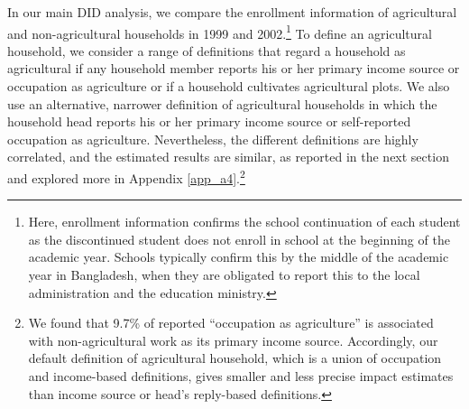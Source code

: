 \documentclass[12pt,letterpaper]{article}
\newcommand{\0}{\ensuremath{\mbox{\boldmath $0$}}}
\begin{document}
In our main DID analysis, we compare the enrollment information of agricultural and non-agricultural households in 1999 and 2002.\footnote{Here, enrollment information confirms the school continuation of each student as the discontinued student does not enroll in school at the beginning of the academic year. Schools typically confirm this by the middle of the academic year in Bangladesh, when they are obligated to report this to the local administration and the education ministry. } To define an agricultural household, we consider a range of definitions that regard a household as agricultural if any household member reports his or her primary income source or occupation as agriculture or if a household cultivates agricultural plots. We also use an alternative, narrower definition of agricultural households in which the household head reports his or her primary income source or self-reported occupation as agriculture. Nevertheless, the different definitions are highly correlated, and the estimated results are similar, as reported in the next section and explored more in Appendix \ref{app_a4}.\footnote{We found that 9.7\% of reported ``occupation as agriculture'' is associated with non-agricultural work as its primary income source. Accordingly, our default definition of agricultural household, which is a union of occupation and income-based definitions, gives smaller and less precise impact estimates than income source or head's reply-based definitions. }
\end{document}

